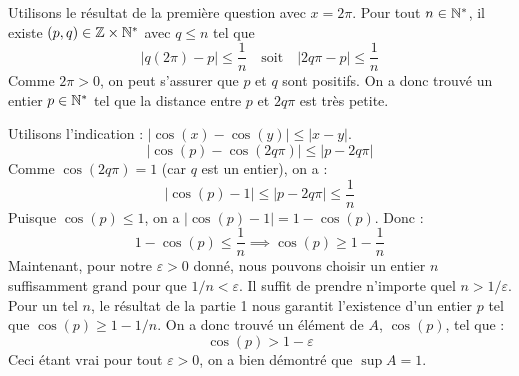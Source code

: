 \documentclass[solutions]{exercices}
\begin{document}
\begin{solution}
\begin{enumerate}
		      Utilisons le résultat de la première question avec $x = 2\pi$. Pour tout $n \in \mathbb{N}^*$, il existe $(p,q) \in \mathbb{Z} \times \mathbb{N}^*$ avec $q \leq n$ tel que
		      \[ |q(2\pi) - p| \leq \frac{1}{n} \quad \text{soit} \quad |2q\pi - p| \leq \frac{1}{n} \]
		      Comme $2\pi>0$, on peut s'assurer que $p$ et $q$ sont positifs. On a donc trouvé un entier $p \in \mathbb{N}^*$ tel que la distance entre $p$ et $2q\pi$ est très petite.

		      Utilisons l'indication : $|\cos(x)-\cos(y)| \leq |x-y|$.
		      \[ |\cos(p) - \cos(2q\pi)| \leq |p - 2q\pi| \]
		      Comme $\cos(2q\pi) = 1$ (car $q$ est un entier), on a :
		      \[ |\cos(p) - 1| \leq |p - 2q\pi| \leq \frac{1}{n} \]
		      Puisque $\cos(p) \leq 1$, on a $|\cos(p)-1| = 1-\cos(p)$. Donc :
		      \[ 1-\cos(p) \leq \frac{1}{n} \implies \cos(p) \geq 1 - \frac{1}{n} \]
		      Maintenant, pour notre $\varepsilon > 0$ donné, nous pouvons choisir un entier $n$ suffisamment grand pour que $1/n < \varepsilon$. Il suffit de prendre n'importe quel $n > 1/\varepsilon$.
		      Pour un tel $n$, le résultat de la partie 1 nous garantit l'existence d'un entier $p$ tel que $\cos(p) \geq 1-1/n$.
		      On a donc trouvé un élément de $A$, $\cos(p)$, tel que :
		      \[ \cos(p) > 1 - \varepsilon \]
		      Ceci étant vrai pour tout $\varepsilon > 0$, on a bien démontré que $\sup A = 1$.
	\end{enumerate}
\end{solution}
\end{document}
